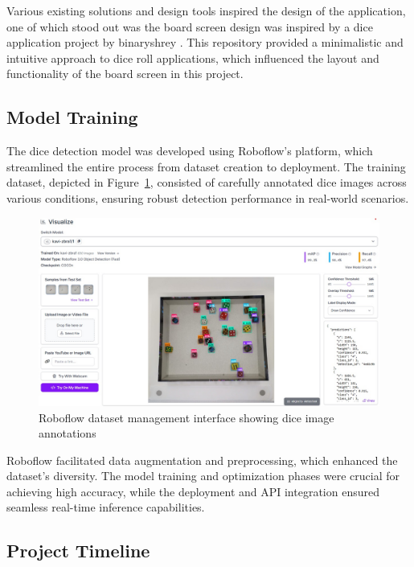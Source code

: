 Various existing solutions and design tools inspired the design of the application, one of which stood out was the board screen design was inspired by a dice application project by binaryshrey \cite{bib:binaryshrey}. This repository provided a minimalistic and intuitive approach to dice roll applications, which influenced the layout and functionality of the board screen in this project.

\subsection{Model Training}

The dice detection model was developed using Roboflow's platform, which streamlined the entire process from dataset creation to deployment. The training dataset, depicted in Figure~\ref{fig:roboflow_dataset}, consisted of carefully annotated dice images across various conditions, ensuring robust detection performance in real-world scenarios.

\begin{figure}[h]
    \centering
    \includegraphics[width=\textwidth]{img/roboflow_dataset.jpg}
    \caption{Roboflow dataset management interface showing dice image annotations}
    \label{fig:roboflow_dataset}
\end{figure}

Roboflow facilitated data augmentation and preprocessing, which enhanced the dataset's diversity. The model training and optimization phases were crucial for achieving high accuracy, while the deployment and API integration ensured seamless real-time inference capabilities.

\subsection{Project Timeline}

